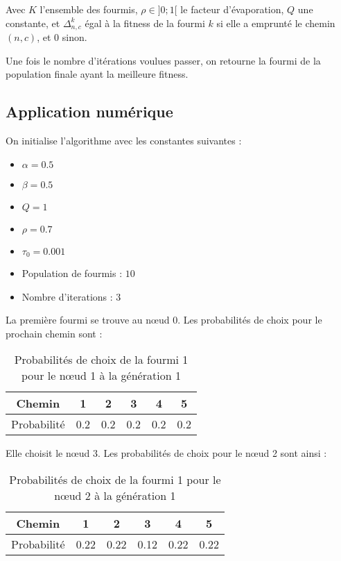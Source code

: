 Avec $K$ l'ensemble des fourmis, $\rho \in ]0;1[$ le facteur d'évaporation, $Q$ une constante, et $\Delta^k_{n,c}$ égal à la fitness de la fourmi $k$ si elle a emprunté le chemin $(n,c)$, et $0$ sinon.

Une fois le nombre d'itérations voulues passer, on retourne la fourmi de la population finale ayant la meilleure fitness.


\subsection{Application numérique}\label{subsec:application-numerique}

On initialise l'algorithme avec les constantes suivantes :

\begin{itemize}
    \item $\alpha = 0.5$
    \item $\beta = 0.5$
    \item $Q = 1$
    \item $\rho = 0.7$
    \item $\tau_0 = 0.001$
    \item Population de fourmis : $10$
    \item Nombre d'iterations : $3$
\end{itemize}

La première fourmi se trouve au n\oe ud $0$.
Les probabilités de choix pour le prochain chemin sont :


\begin{table}[h!]
    \centering
    \begin{tabular}{|c|c|c|c|c|c|}
        \hline
        Chemin      & 1   & 2   & 3   & 4   & 5   \\
        \hline
        Probabilité & 0.2 & 0.2 & 0.2 & 0.2 & 0.2 \\
        \hline
    \end{tabular}
    \caption{Probabilités de choix de la fourmi 1 pour le n\oe ud 1 à la génération 1}\label{tab:fourmi-1-noeud-1-gen-1}
\end{table}

Elle choisit le n\oe ud $3$.
Les probabilités de choix pour le n\oe ud 2 sont ainsi :

\begin{table}[h!]
    \centering
    \begin{tabular}{|c|c|c|c|c|c|}
        \hline
        Chemin      & 1    & 2    & 3    & 4    & 5    \\
        \hline
        Probabilité & 0.22 & 0.22 & 0.12 & 0.22 & 0.22 \\
        \hline
    \end{tabular}
    \caption{Probabilités de choix de la fourmi 1 pour le n\oe ud 2 à la génération 1}\label{tab:fourmi-1-noeud-2-gen-1}
\end{table}

